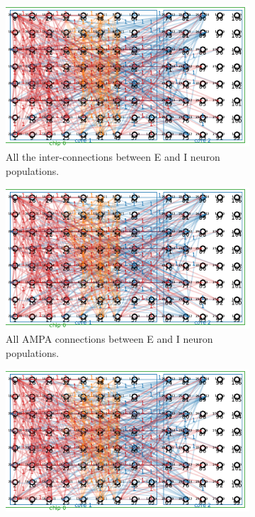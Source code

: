 \begin{figure}
	\begin{subfigure}{0.5\textwidth}
		\centering
		\includegraphics[page=1, width=\columnwidth]{./img/implementation/network.pdf}
		\caption{All the inter-connections between E and I neuron populations.}
		\label{fig:NNonboard1}
	\end{subfigure}
	\begin{subfigure}{0.5\textwidth}
		\centering
		\includegraphics[page=2, width=\columnwidth]{./img/implementation/network.pdf}
		\caption{All AMPA connections between E and I neuron populations.}
		\label{fig:NNonboard2}
	\end{subfigure}
	\begin{subfigure}{0.5\textwidth}
		\centering
		\includegraphics[page=3, width=\columnwidth]{./img/implementation/network.pdf}

\end{subfigure}
\end{figure}
